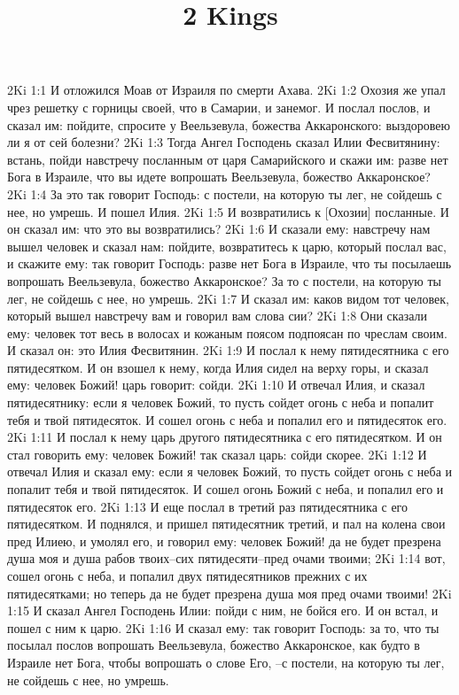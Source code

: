 

\title{2 Kings}

2Ki 1:1  И отложился Моав от Израиля по смерти Ахава.
2Ki 1:2  Охозия же упал чрез решетку с горницы своей, что в Самарии, и занемог. И послал послов, и сказал им: пойдите, спросите у Веельзевула, божества Аккаронского: выздоровею ли я от сей болезни?
2Ki 1:3  Тогда Ангел Господень сказал Илии Фесвитянину: встань, пойди навстречу посланным от царя Самарийского и скажи им: разве нет Бога в Израиле, что вы идете вопрошать Веельзевула, божество Аккаронское?
2Ki 1:4  За это так говорит Господь: с постели, на которую ты лег, не сойдешь с нее, но умрешь. И пошел Илия.
2Ki 1:5  И возвратились к [Охозии] посланные. И он сказал им: что это вы возвратились?
2Ki 1:6  И сказали ему: навстречу нам вышел человек и сказал нам: пойдите, возвратитесь к царю, который послал вас, и скажите ему: так говорит Господь: разве нет Бога в Израиле, что ты посылаешь вопрошать Веельзевула, божество Аккаронское? За то с постели, на которую ты лег, не сойдешь с нее, но умрешь.
2Ki 1:7  И сказал им: каков видом тот человек, который вышел навстречу вам и говорил вам слова сии?
2Ki 1:8  Они сказали ему: человек тот весь в волосах и кожаным поясом подпоясан по чреслам своим. И сказал он: это Илия Фесвитянин.
2Ki 1:9  И послал к нему пятидесятника с его пятидесятком. И он взошел к нему, когда Илия сидел на верху горы, и сказал ему: человек Божий! царь говорит: сойди.
2Ki 1:10  И отвечал Илия, и сказал пятидесятнику: если я человек Божий, то пусть сойдет огонь с неба и попалит тебя и твой пятидесяток. И сошел огонь с неба и попалил его и пятидесяток его.
2Ki 1:11  И послал к нему царь другого пятидесятника с его пятидесятком. И он стал говорить ему: человек Божий! так сказал царь: сойди скорее.
2Ki 1:12  И отвечал Илия и сказал ему: если я человек Божий, то пусть сойдет огонь с неба и попалит тебя и твой пятидесяток. И сошел огонь Божий с неба, и попалил его и пятидесяток его.
2Ki 1:13  И еще послал в третий раз пятидесятника с его пятидесятком. И поднялся, и пришел пятидесятник третий, и пал на колена свои пред Илиею, и умолял его, и говорил ему: человек Божий! да не будет презрена душа моя и душа рабов твоих--сих пятидесяти--пред очами твоими;
2Ki 1:14  вот, сошел огонь с неба, и попалил двух пятидесятников прежних с их пятидесятками; но теперь да не будет презрена душа моя пред очами твоими!
2Ki 1:15  И сказал Ангел Господень Илии: пойди с ним, не бойся его. И он встал, и пошел с ним к царю.
2Ki 1:16  И сказал ему: так говорит Господь: за то, что ты посылал послов вопрошать Веельзевула, божество Аккаронское, как будто в Израиле нет Бога, чтобы вопрошать о слове Его, --с постели, на которую ты лег, не сойдешь с нее, но умрешь.
